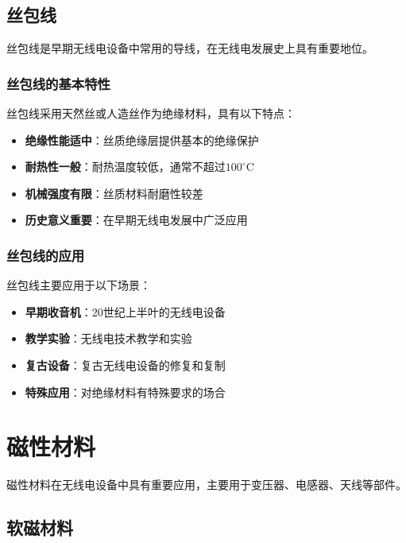 \documentclass[12pt,UTF8]{ctexbook}
\begin{document}
\section{丝包线}

丝包线是早期无线电设备中常用的导线，在无线电发展史上具有重要地位。

\subsection{丝包线的基本特性}

丝包线采用天然丝或人造丝作为绝缘材料，具有以下特点：

\begin{itemize}[leftmargin=3.5em]
    \item \textbf{绝缘性能适中}：丝质绝缘层提供基本的绝缘保护
    \item \textbf{耐热性一般}：耐热温度较低，通常不超过$100^\circ$C
    \item \textbf{机械强度有限}：丝质材料耐磨性较差
    \item \textbf{历史意义重要}：在早期无线电发展中广泛应用
\end{itemize}

\subsection{丝包线的应用}

丝包线主要应用于以下场景：

\begin{itemize}[leftmargin=3.5em]
    \item \textbf{早期收音机}：20世纪上半叶的无线电设备
    \item \textbf{教学实验}：无线电技术教学和实验
    \item \textbf{复古设备}：复古无线电设备的修复和复制
    \item \textbf{特殊应用}：对绝缘材料有特殊要求的场合
\end{itemize}

\chapter{磁性材料}

磁性材料在无线电设备中具有重要应用，主要用于变压器、电感器、天线等部件。

\section{软磁材料}
\end{document}
